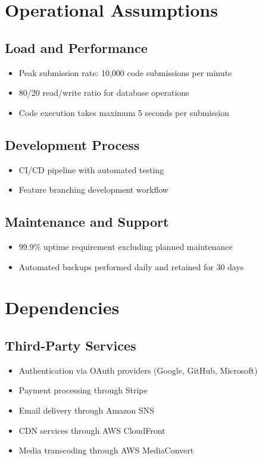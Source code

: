 \documentclass[a4paper, 11pt]{scrreprt}
\begin{document}
\section{Operational Assumptions}

\subsection{Load and Performance}
\begin{itemize}
    \item Peak submission rate: 10,000 code submissions per minute
    \item 80/20 read/write ratio for database operations
    \item Code execution takes maximum 5 seconds per submission
\end{itemize}

\subsection{Development Process}
\begin{itemize}
    \item CI/CD pipeline with automated testing
    \item Feature branching development workflow
\end{itemize}

\subsection{Maintenance and Support}
\begin{itemize}
    \item 99.9\% uptime requirement excluding planned maintenance
    \item Automated backups performed daily and retained for 30 days
\end{itemize}

\section{Dependencies}

\subsection{Third-Party Services}
\begin{itemize}
    \item Authentication via OAuth providers (Google, GitHub, Microsoft)
    \item Payment processing through Stripe
    \item Email delivery through Amazon SNS
    \item CDN services through AWS CloudFront
    \item Media transcoding through AWS MediaConvert
\end{itemize}
\end{document}
